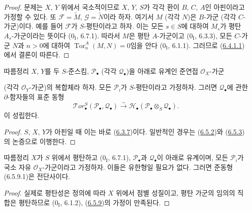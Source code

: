 \begin{proof}
문제는 $X$, $Y$ 위에서 국소적이므로 $X$, $Y$, $S$가 각각 환이
$B$, $C$, $A$인 아핀이라고 가정할 수 있다. 또
$\mathscr F=\widetilde M$, $\mathscr G=\widetilde N$이라 하자. 여기서
$M$ (각각 $N$)은 $B$-가군 (각각 $C$-가군)이다. 예를 들어
$\mathscr F$가 $S$-평탄이라고 하자. 이는 모든 $s\in S$에 대하여
$M_s$가 평탄 $A_s$-가군이라는 뜻이다 ($0_{\mathrm I}$, 6.7.1).
따라서 $M$은 평탄 $A$-가군이고 ($0_{\mathrm I}$, 6.3.3), 모든
$C$-가군 $N$과 $n>0$에 대하여
$\operatorname{Tor}_n^A(M,N)=0$임을 안다 ($0_{\mathrm I}$, 6.1.1).
그러므로 (\hyperref[III.6.4.1.1.fr]{6.4.1.1})에서 결론이 따른다.
\end{proof}

\begin{namedtheorem}[6.5.9]{따름정리}
\label{III.6.5.9-fr}
$X$, $Y$를 두 $S$-준스킴, $\mathscr P_\bullet$ (각각
$\mathscr Q_\bullet$)을 아래로 유계인 준연접 $\mathscr O_X$-가군


(각각 $\mathscr O_Y$-가군)의 복합체라 하자. 모든
$\mathscr P_i$가 $S$-평탄이라고 가정하자. 그러면
$\mathscr Q_\bullet$에 관한 $\partial$-함자들의 표준 동형
\[
  \mathscr{T}\!or_\bullet^S(\mathscr P_\bullet,\mathscr Q_\bullet)
  \xrightarrow{\sim}
  \mathscr H_\bullet(\mathscr P_\bullet\otimes_S\mathscr Q_\bullet).
  \tag{6.5.9.1}\label{III.6.5.9.1.fr}
\]
이 성립한다.
\end{namedtheorem}

\begin{proof}
$S$, $X$, $Y$가 아핀일 때 이는 바로
(\hyperref[III.6.3.7-fr]{6.3.7})이다. 일반적인 경우는
(\hyperref[III.6.5.2-fr]{6.5.2})와
(\hyperref[III.6.5.3-fr]{6.5.3})의 논증으로 이행한다.
\end{proof}

\begin{namedtheorem}[6.5.10]{따름정리}
\label{III.6.5.10-fr}
$X$가 $S$ 위에서 평탄하고 ($0_{\mathrm I}$, 6.7.1),
$\mathscr P_\bullet$과 $\mathscr Q_\bullet$이 아래로 유계이며, 모든
$\mathscr P_i$가 국소 자유 $\mathscr O_X$-가군이라고 가정하자. 이들은
유한형일 필요가 없다. 그러면 준동형 (6.5.9.1)은 전단사이다.
\end{namedtheorem}

\begin{proof}
실제로 평탄성은 정의에 따라 $X$ 위에서 점별 성질이고, 평탄 가군의
임의의 직합은 평탄하므로 ($0_{\mathrm I}$, 6.1.2),
(\hyperref[III.6.5.9-fr]{6.5.9})의 가정이 만족된다.
\end{proof}

